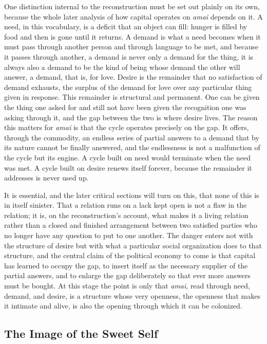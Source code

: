 \documentclass[11pt,a4paper]{article}
\begin{document}
One distinction internal to the reconstruction must be set out plainly on its own, because the whole later analysis of how capital operates on \textit{amai} depends on it. A need, in this vocabulary, is a deficit that an object can fill: hunger is filled by food and then is gone until it returns. A demand is what a need becomes when it must pass through another person and through language to be met, and because it passes through another, a demand is never only a demand for the thing, it is always also a demand to be the kind of being whose demand the other will answer, a demand, that is, for love. Desire is the remainder that no satisfaction of demand exhausts, the surplus of the demand for love over any particular thing given in response. This remainder is structural and permanent. One can be given the thing one asked for and still not have been given the recognition one was asking through it, and the gap between the two is where desire lives. The reason this matters for \textit{amai} is that the cycle operates precisely on the gap. It offers, through the commodity, an endless series of partial answers to a demand that by its nature cannot be finally answered, and the endlessness is not a malfunction of the cycle but its engine. A cycle built on need would terminate when the need was met. A cycle built on desire renews itself forever, because the remainder it addresses is never used up.

It is essential, and the later critical sections will turn on this, that none of this is in itself sinister. That a relation runs on a lack kept open is not a flaw in the relation; it is, on the reconstruction's account, what makes it a living relation rather than a closed and finished arrangement between two satisfied parties who no longer have any question to put to one another. The danger enters not with the structure of desire but with what a particular social organization does to that structure, and the central claim of the political economy to come is that capital has learned to occupy the gap, to insert itself as the necessary supplier of the partial answers, and to enlarge the gap deliberately so that ever more answers must be bought. At this stage the point is only that \textit{amai}, read through need, demand, and desire, is a structure whose very openness, the openness that makes it intimate and alive, is also the opening through which it can be colonized.

\subsection{The Image of the Sweet Self}
\end{document}
